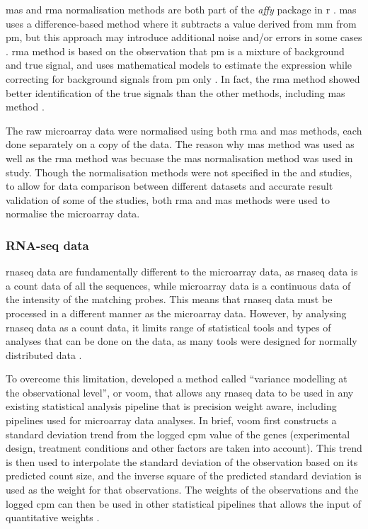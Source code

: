 \Gls{mas} and \gls{rma} normalisation methods are both part of the \textit{affy} package in \gls{r} \citep{Gautier2004}.
\Gls{mas} uses a difference-based method where it subtracts a value derived from \gls{mm} from \gls{pm}, but this approach may introduce additional noise and/or errors in some cases \citep{Irizarry2003}.
\Gls{rma} method is based on the observation that \gls{pm} is a mixture of background and true signal, and uses mathematical models to estimate the expression while correcting for background signals from \gls{pm} only \citep{Irizarry2003}.
In fact, the \gls{rma} method showed better identification of the true signals than the other methods, including \Gls{mas} method \citep{Irizarry2003}.

The raw microarray data were normalised using both \gls{rma} and \gls{mas} methods, each done separately on a copy of the data.
The reason why \gls{mas} method was used as well as the \gls{rma} method was becuase the \gls{mas} normalisation method was used in \citet{Gatza2010a} study.
Though the normalisation methods were not specified in the \citet{Creighton2012} and \citet{Fuentes-Mattei2014} studies, to allow for data comparison between different datasets and accurate result validation of some of the studies, both \gls{rma} and \gls{mas} methods were used to normalise the microarray data.

\subsubsection{RNA-seq data}
\label{ssub:rna_seq_data}

\gls{rnaseq} data are fundamentally different to the microarray data, as \gls{rnaseq} data is a count data of all the sequences, while microarray data is a continuous data of the intensity of the matching probes.
This means that \gls{rnaseq} data must be processed in a different manner as the microarray data.
However, by analysing \gls{rnaseq} data as a count data, it limits range of statistical tools and types of analyses that can be done on the data, as many tools were designed for normally distributed data \citep{Law2014}.

To overcome this limitation, \citet{Law2014} developed a method called ``variance modelling at the observational level'', or voom, that allows any \gls{rnaseq} data to be used in any existing statistical analysis pipeline that is precision weight aware, including pipelines used for microarray data analyses.
In brief, voom first constructs a standard deviation trend from the logged \gls{cpm} value of the genes (experimental design, treatment conditions and other factors are taken into account).
This trend is then used to interpolate the standard deviation of the observation based on its predicted count size, and the inverse square of the predicted standard deviation is used as the weight  for that observations.
The weights of the observations and the logged \gls{cpm} can then be used in other statistical pipelines that allows the input of quantitative weights \citep{Law2014}.


